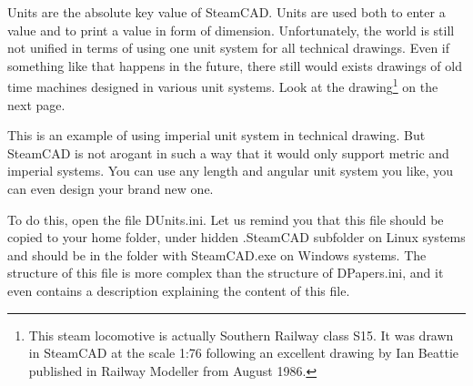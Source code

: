 Units are the absolute key value of SteamCAD. Units are used both to enter a value and
to print a value in form of dimension. Unfortunately, the world is still not unified
in terms of using one unit system for all technical drawings. Even if something like
that happens in the future, there still would exists drawings of old time machines
designed in various unit systems. Look at the drawing\footnote{This steam locomotive
is actually Southern Railway class S15. It was drawn in SteamCAD at the scale 1:76
following an excellent drawing by Ian Beattie published in Railway Modeller from August
1986.} on the next page.

This is an example of using imperial unit system in technical drawing. But SteamCAD
is not arogant in such a way that it would only support metric and imperial systems.
You can use any length and angular unit system you like, you can even design your
brand new one.

To do this, open the file DUnits.ini. Let us remind you that this file should be copied
to your home folder, under hidden .SteamCAD subfolder on Linux systems and should
be in the folder with SteamCAD.exe on Windows systems. The structure of this file
is more complex than the structure of DPapers.ini, and it even contains a description
explaining the content of this file.

\pagestyle{empty}
\begin{center}
\vspace*{-1.5cm}
\hspace*{-0.5cm}
\end{center}
\newpage

